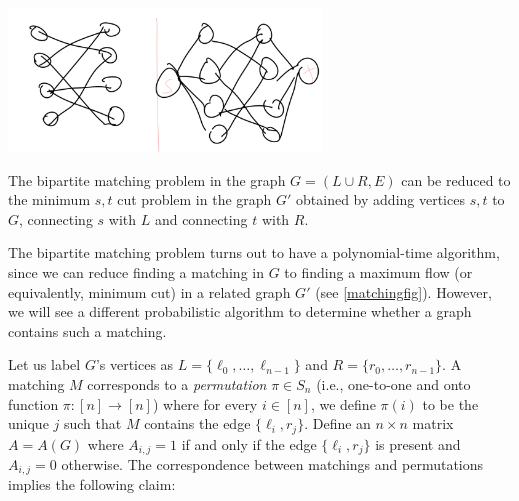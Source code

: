 \begin{marginfigure}
\centering
\includegraphics[width=\linewidth, height=1.5in, keepaspectratio]{../figure/matchingfig.png}
\caption{The bipartite matching problem in the graph \(G=(L\cup R,E)\)
can be reduced to the minimum \(s,t\) cut problem in the graph \(G'\)
obtained by adding vertices \(s,t\) to \(G\), connecting \(s\) with
\(L\) and connecting \(t\) with \(R\).}
\label{matchingfig}
\end{marginfigure}

The bipartite matching problem turns out to have a polynomial-time
algorithm, since we can reduce finding a matching in \(G\) to finding a
maximum flow (or equivalently, minimum cut) in a related graph \(G'\)
(see \cref{matchingfig}). However, we will see a different probabilistic
algorithm to determine whether a graph contains such a matching.

Let us label \(G\)'s vertices as \(L = \{ \ell_0,\ldots,\ell_{n-1} \}\)
and \(R = \{ r_0, \ldots, r_{n-1} \}\). A matching \(M\) corresponds to
a \emph{permutation} \(\pi \in S_n\) (i.e., one-to-one and onto function
\(\pi: [n] \rightarrow [n]\)) where for every \(i\in [n]\), we define
\(\pi(i)\) to be the unique \(j\) such that \(M\) contains the edge
\(\{ \ell_i ,r_j \}\). Define an \(n\times n\) matrix \(A=A(G)\) where
\(A_{i,j}=1\) if and only if the edge \(\{\ell_i,r_j\}\) is present and
\(A_{i,j}=0\) otherwise. The correspondence between matchings and
permutations implies the following claim:

\hypertarget{matchpolylem}{}

